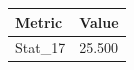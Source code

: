 \begin{tabular}{ll}
\toprule
Metric & Value \\
\midrule
Stat\_17 & 25.500 \\
\bottomrule
\end{tabular}